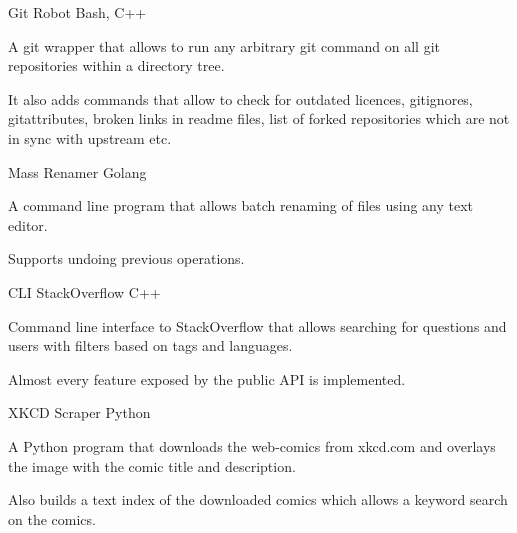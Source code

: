 \begin{projentries}
  \projentry%
    {Git Robot} %
    {Bash, C++} %
    {} %
    {%
      \begin{projitems} %
        \item{A git wrapper that allows to run any arbitrary git command on all git repositories within a directory tree.}
        \item{It also adds commands that allow to check for outdated licences, gitignores, gitattributes, broken links in readme files, list of forked repositories which are not in sync with upstream etc.}
      \end{projitems}
    }

  \projentry%
    {Mass Renamer} %
    {Golang} %
    {} %
    {%
      \begin{projitems} %
        \item{A command line program that allows batch renaming of files using any text editor.}
        \item{Supports undoing previous operations.}
      \end{projitems}
    }

  \projentry%
    {CLI StackOverflow} %
    {C++} %
    {} %
    {%
      \begin{projitems} %
        \item{Command line interface to StackOverflow that allows searching for questions and users with filters based on tags and languages.}
        \item{Almost every feature exposed by the public API is implemented.}
      \end{projitems}
    }

  \projentry%
    {XKCD Scraper} %
    {Python} %
    {} %
    {%
      \begin{projitems} %
        \item{A Python program that downloads the web-comics from xkcd.com and overlays the image with the comic title and description.}
        \item{Also builds a text index of the downloaded comics which allows a keyword search on the comics.}
      \end{projitems}
    }


\end{projentries}
